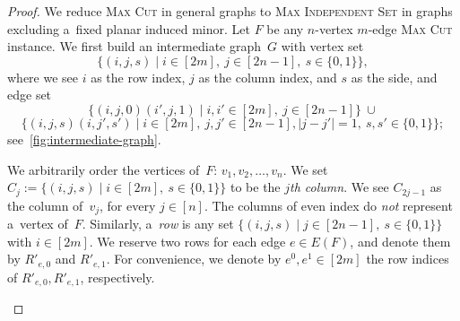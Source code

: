 \documentclass[a4paper,UKenglish,cleveref,autoref]{lipics-v2021}
\newcommand{\mis}{\textsc{Max Independent Set}\xspace}
\begin{document}
\begin{proof}
\leavevmode
We reduce \textsc{Max Cut} in general graphs to \mis in graphs excluding a~fixed planar induced minor.
  Let $F$ be any $n$-vertex $m$-edge \textsc{Max Cut} instance.
\leavevmode
We first build an intermediate graph~$G$ with vertex set
  \[ \{(i,j,s) \mid i \in [2m],~j \in [2n-1],~s \in \{0,1\}\},\]
  where we see $i$ as the row index, $j$ as the column index, and $s$ as the side, and edge set
  \[ \{(i,j,0)(i',j,1) \mid i, i' \in [2m],~j \in [2n-1]\}~\cup \]
  \[ \{(i,j,s)(i,j',s') \mid i \in [2m],~j, j' \in [2n-1], |j-j'|=1,~s, s' \in \{0,1\}\};\]
  see~\cref{fig:intermediate-graph}.

  We arbitrarily order the vertices of~$F$: $v_1, v_2, \ldots, v_n$.
  We set $C_j := \{(i,j,s) \mid i \in [2m],~s \in \{0,1\}\}$ to be the \emph{$j$th column}.
  We see $C_{2j-1}$ as the column of~$v_j$, for every $j \in [n]$.
  The columns of even index do \emph{not} represent a~vertex of~$F$.
  Similarly, a~\emph{row} is any set $\{(i,j,s) \mid j \in [2n-1],~s \in \{0,1\}\}$ with $i \in [2m]$.
  We reserve two rows for each edge $e \in E(F)$, and denote them by $R'_{e,0}$ and $R'_{e,1}$.
  For convenience, we denote by $e^0, e^1 \in [2m]$ the row indices of $R'_{e,0}, R'_{e,1}$, respectively. 

\begin{figure}[!ht]
\centering
{}
\end{figure}
\end{proof}
\end{document}
